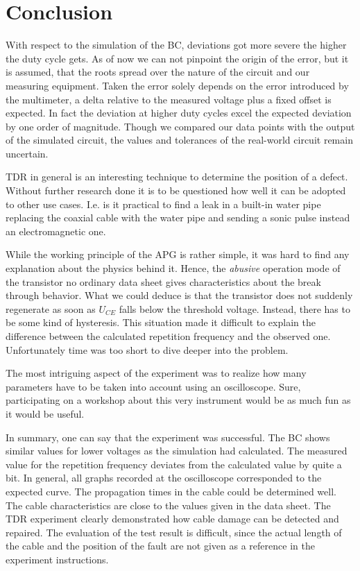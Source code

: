 \chapter{Conclusion}
%
With respect to the simulation of the BC, deviations got more severe the higher the duty cycle gets. As of now we can not
pinpoint the origin of the error, but it is assumed, that the roots spread over the nature of the circuit and our measuring equipment.
Taken the error solely depends on the error introduced by the multimeter, a delta relative to the measured voltage plus a
fixed offset is expected. In fact the deviation at higher duty cycles excel the expected deviation by one order of magnitude.
Though we compared our data points with the output of the simulated circuit, the values and tolerances of the real-world
circuit remain uncertain.\par
%
TDR in general is an interesting technique to determine the position of a defect. Without further research done it
is to be questioned how well it can be adopted to other use cases. I.e. is it practical to find a leak in a built-in water
pipe replacing the coaxial cable with the water pipe and sending a sonic pulse instead an electromagnetic one.\par
%
While the working principle of the APG is rather simple, it was hard to find any explanation about the physics behind it.
Hence, the \textit{abusive} operation mode of the transistor no ordinary data sheet gives characteristics about the break
through behavior. What we could deduce is that the transistor does not suddenly regenerate as soon as \( U_{CE} \)
falls below the threshold voltage. Instead, there has to be some kind of hysteresis. This situation made it difficult to
explain the difference between the calculated repetition frequency and the observed one. Unfortunately time was too short
to dive deeper into the problem.\par
%
The most intriguing aspect of the experiment was to realize how many parameters have to be taken into account using an
oscilloscope. Sure, participating on a workshop about this very instrument would be as much fun as it would be useful.\par\medskip
%
In summary, one can say that the experiment was successful. The BC shows similar values for lower voltages
as the simulation had calculated. The measured value for the repetition frequency deviates from the calculated value by
quite a bit. In general, all graphs recorded at the oscilloscope corresponded to the expected curve. The propagation
times in the cable could be determined well. The cable characteristics are close to the values given in the data sheet.
The TDR experiment clearly demonstrated how cable damage can be detected and repaired. The evaluation
of the test result is difficult, since the actual length of the cable and the position of the fault are not given as a
reference in the experiment instructions.